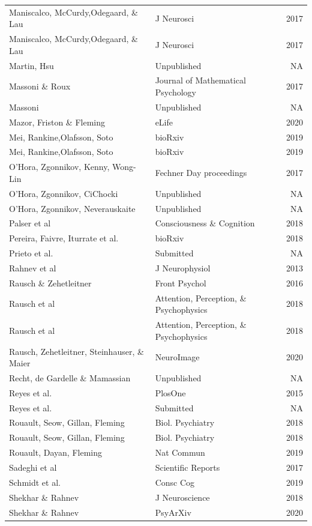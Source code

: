 \documentclass[
]{article}
\begin{document}
\begin{longtable}[t]{llr}
Maniscalco, McCurdy,Odegaard, \& Lau & J Neurosci & 2017\\
Maniscalco, McCurdy,Odegaard, \& Lau & J Neurosci & 2017\\
Martin, Hsu & Unpublished & NA\\
\addlinespace
Massoni \& Roux & Journal of Mathematical Psychology & 2017\\
Massoni & Unpublished & NA\\
Mazor, Friston \& Fleming & eLife & 2020\\
Mei, Rankine,Olafsson, Soto & bioRxiv & 2019\\
Mei, Rankine,Olafsson, Soto & bioRxiv & 2019\\
\addlinespace
O'Hora, Zgonnikov, Kenny, Wong-Lin & Fechner Day proceedings & 2017\\
O'Hora, Zgonnikov, CiChocki & Unpublished & NA\\
O'Hora, Zgonnikov, Neverauskaite & Unpublished & NA\\
Palser et al & Consciousness \& Cognition & 2018\\
Pereira, Faivre, Iturrate et al. & bioRxiv & 2018\\
\addlinespace
Prieto et al. & Submitted & NA\\
Rahnev et al & J Neurophysiol & 2013\\
Rausch \& Zehetleitner & Front Psychol & 2016\\
Rausch et al & Attention, Perception, \& Psychophysics & 2018\\
Rausch et al & Attention, Perception, \& Psychophysics & 2018\\
\addlinespace
Rausch, Zehetleitner, Steinhauser, \& Maier & NeuroImage & 2020\\
Recht, de Gardelle \& Mamassian & Unpublished & NA\\
Reyes et al. & PlosOne & 2015\\
Reyes et al. & Submitted & NA\\
Rouault, Seow, Gillan, Fleming & Biol. Psychiatry & 2018\\
\addlinespace
Rouault, Seow, Gillan, Fleming & Biol. Psychiatry & 2018\\
Rouault, Dayan, Fleming & Nat Commun & 2019\\
Sadeghi et al & Scientific Reports & 2017\\
Schmidt et al. & Consc Cog & 2019\\
Shekhar \& Rahnev & J Neuroscience & 2018\\
\addlinespace
Shekhar \& Rahnev & PsyArXiv & 2020\\

\end{longtable}
\end{document}
